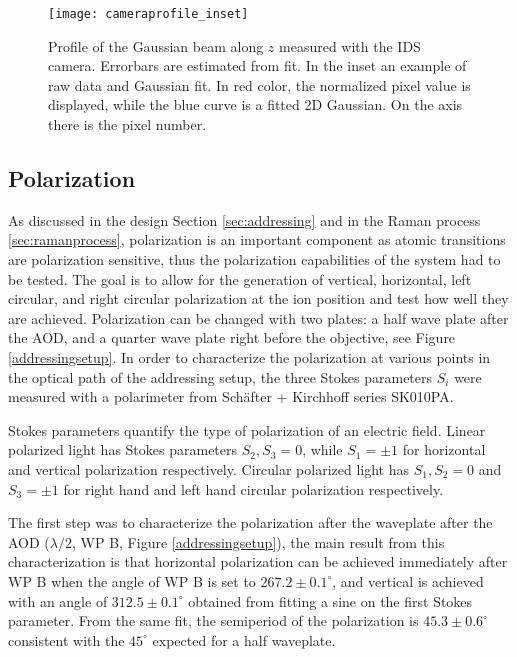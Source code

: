 \begin{figure}
\centering
\texttt{[image: cameraprofile\_inset]}
\caption{Profile of the Gaussian beam along $z$ measured with the IDS camera. Errorbars are estimated from fit. In the inset an example of raw data and Gaussian fit. In red color, the normalized pixel value is displayed, while the blue curve is a fitted 2D Gaussian. On the axis there is the pixel number.}
\label{cameraprofile}
\end{figure}

\subsection{Polarization}
\label{sec:polarization}
As discussed in the design Section \ref{sec:addressing} and in the Raman process \ref{sec:ramanprocess}, polarization is an important component as atomic transitions are polarization sensitive, thus the polarization capabilities of the system had to be tested. The goal is to allow for the generation of vertical, horizontal, left circular, and right circular polarization at the ion position and test how well they are achieved. Polarization can be changed with two plates: a half wave plate after the AOD, and a quarter wave plate right before the objective, see Figure \ref{addressingsetup}. In order to characterize the polarization at various points in the optical path of the addressing setup, the three Stokes parameters $S_i$ \cite{stokes} were measured with a polarimeter from Sch\"after + Kirchhoff series SK010PA.\par
Stokes parameters quantify the type of polarization of an electric field. Linear polarized light has Stokes parameters $S_2,S_3 = 0$, while $S_1 = \pm 1$ for horizontal and vertical polarization respectively. Circular polarized light has $S_1, S_2 = 0$ and $S_3=\pm 1$ for right hand and left hand circular polarization respectively.\par
The first step was to characterize the polarization after the waveplate after the AOD ($\lambda/2$, WP B, Figure \ref{addressingsetup}), the main result from this characterization is that horizontal polarization can be achieved immediately after WP B when the angle of WP B is set to $267.2\pm 0.1 ^{\circ}$, and vertical is achieved with an angle of $312.5\pm0.1^{\circ}$ obtained from fitting a sine on the first Stokes parameter. From the same fit, the semiperiod of the polarization is $45.3\pm 0.6^\circ$ consistent with the $45^\circ$ expected for a half waveplate.\par
